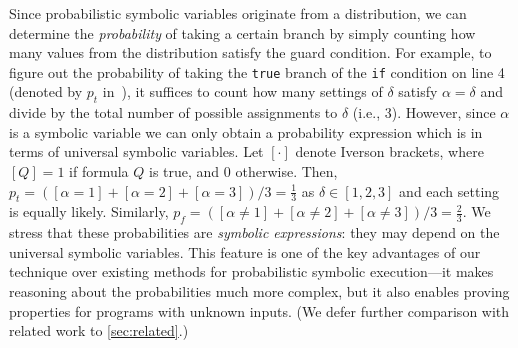 \documentclass[acmsmall,review,anonymous]{acmart}\settopmatter{printfolios=true,printccs=false,printacmref=false}
\begin{document}
Since probabilistic symbolic variables originate from a distribution, we can determine the \textit{probability} of taking a certain branch by simply counting how many values from the distribution satisfy the guard condition.
% 
For example, to figure out the probability of taking the \texttt{true} branch of the \texttt{if} condition on line 4 (denoted by $p_t$ in~), it suffices to count how many settings of $\delta$ satisfy $\alpha = \delta$ and divide by the total number of possible assignments to $\delta$ (i.e., 3).
% 
However, since $\alpha$ is a symbolic variable we can only obtain a probability expression which is in terms of universal symbolic variables.
% 
Let $[\cdot]$ denote Iverson brackets, where $[Q]=1$ if formula $Q$ is true, and 0 otherwise.
% 
Then, $p_t = ([\alpha = 1] + [\alpha = 2] + [\alpha = 3])/3 = \frac{1}{3}$ as $\delta \in [1,2,3]$ and each setting is equally likely.
% 
Similarly, $p_f = ([\alpha \neq 1] + [\alpha \neq 2] + [\alpha \neq 3])/3 = \frac{2}{3}$.
% 
We stress that these probabilities are \emph{symbolic expressions}: they may
depend on the universal symbolic variables. This feature is one of the key
advantages of our technique over existing methods for probabilistic symbolic
execution---it makes reasoning about the probabilities much more complex, but it
also enables proving properties for programs with unknown inputs. (We defer
further comparison with related work to \cref{sec:related}.)
\end{document}
